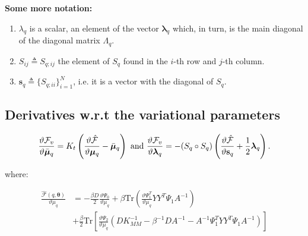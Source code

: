 \textbf{Some more notation:} 
\begin{enumerate}
\item $\lambda_q$ is a scalar, an element of the vector $\boldsymbol \lambda_q$ which, in turn, is the main diagonal of the diagonal matrix $\Lambda_q$. 
\item $S_{ij} \triangleq S_{q;ij}$ the element of $S_q$ found in the $i$-th row and $j$-th column.
\item $\mathbf{s}_q \triangleq \lbrace S_{q;ii} \rbrace_{i=1}^N$, i.e. it is a vector with the diagonal of $S_q$.
\end{enumerate}

\subsection{Derivatives w.r.t the variational parameters}
\begin{equation}
    \label{derivVarParamSuppl}
\frac{\vartheta \mathcal{F}_v}{\vartheta \bar{\boldsymbol \mu}_q} 
=  K_t \left( \frac{\vartheta \hat{\mathcal{F}}}{\vartheta \boldsymbol \mu_q} - \bar{\boldsymbol \mu}_q \right)
\text{ and }
 \frac{\vartheta \mathcal{F}_v}{\vartheta \boldsymbol \lambda_q}
= - ( S_q \circ S_q) \left( \frac{\vartheta \hat{\mathcal{F}}}{\vartheta \mathbf{s}_q} + \frac{1}{2} \boldsymbol \lambda_q \right).
\end{equation}

where:

\begin{align}
 \frac{\hat{\mathcal{F}}(q, \boldsymbol \theta)}{\vartheta \mu_q}
{}& = - \frac{\beta D}{2} \frac{\vartheta \Psi_0}{\vartheta \mu_q}
    + \beta \text{Tr} \left(\frac{\vartheta \Psi_1^T}{\vartheta \mu_q} Y Y^T \Psi_1 A^{-1} \right) \nonumber \\
{}& + \frac{\beta}{2} \text{Tr} \left[ \frac{\vartheta \Psi_2}{\vartheta \mu_q}
       \left(
	  D K_{MM}^{-1} - \beta^{-1} D A^{-1} - A^{-1} \Psi_1^T Y Y^T \Psi_1 A^{-1}
       \right) \right] \label{derivFTildeEfficientComputationMu}
\end{align}


